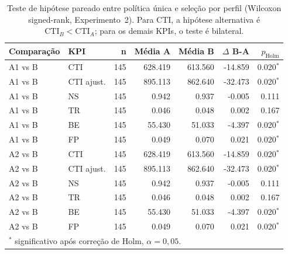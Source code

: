 \begin{table}[htb]
\centering
\small
\caption{Teste de hipótese pareado entre política única e seleção por perfil (Wilcoxon signed-rank, Experimento~2). Para CTI, a hipótese alternativa é $\mathrm{CTI}_{B}<\mathrm{CTI}_{A}$; para os demais KPIs, o teste é bilateral.}
\label{tab:strategy_hypothesis_tests}
\begin{tabular}{@{}llrrrrr@{}}
\toprule
Comparação & KPI & n & Média A & Média B & $\Delta$ B-A & $p_{\mathrm{Holm}}$ \\
\midrule
A1 vs B & CTI & 145 & 628.419 & 613.560 & -14.859 & 0.020$^{*}$ \\
A1 vs B & CTI ajust. & 145 & 895.113 & 862.640 & -32.473 & 0.020$^{*}$ \\
A1 vs B & NS & 145 & 0.942 & 0.937 & -0.005 & 0.111 \\
A1 vs B & TR & 145 & 0.046 & 0.048 & 0.002 & 0.167 \\
A1 vs B & BE & 145 & 55.430 & 51.033 & -4.397 & 0.020$^{*}$ \\
A1 vs B & FP & 145 & 0.049 & 0.070 & 0.021 & 0.020$^{*}$ \\
A2 vs B & CTI & 145 & 628.419 & 613.560 & -14.859 & 0.020$^{*}$ \\
A2 vs B & CTI ajust. & 145 & 895.113 & 862.640 & -32.473 & 0.020$^{*}$ \\
A2 vs B & NS & 145 & 0.942 & 0.937 & -0.005 & 0.111 \\
A2 vs B & TR & 145 & 0.046 & 0.048 & 0.002 & 0.167 \\
A2 vs B & BE & 145 & 55.430 & 51.033 & -4.397 & 0.020$^{*}$ \\
A2 vs B & FP & 145 & 0.049 & 0.070 & 0.021 & 0.020$^{*}$ \\
\bottomrule
\multicolumn{7}{l}{\scriptsize $^{*}$ significativo após correção de Holm, $\alpha=0{,}05$.} \\
\end{tabular}
\end{table}